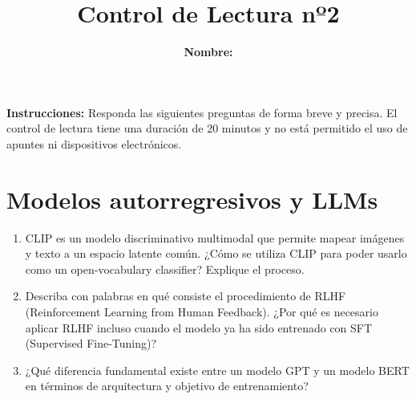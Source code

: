 \documentclass{article}
\title{\bfseries{Control de Lectura nº2}\vspace{0.5cm}}
\author{\textbf{Nombre:} \rule{12cm}{0.4pt}}
\begin{document}
\maketitle

\hspace{-0.5cm}\textbf{Instrucciones:} Responda las siguientes preguntas de forma breve y precisa. El control de lectura tiene una duración de 20 minutos y no está permitido el uso de apuntes ni dispositivos electrónicos.

\section*{Modelos autorregresivos y LLMs}
\begin{enumerate}[{\bf P1.}]
	\item CLIP es un modelo discriminativo multimodal que permite mapear imágenes y texto a un espacio latente común. ¿Cómo se utiliza CLIP para poder usarlo como un open-vocabulary classifier? Explique el proceso.
	\item Describa con palabras en qué consiste el procedimiento de RLHF (Reinforcement Learning from Human Feedback). ¿Por qué es necesario aplicar RLHF incluso cuando el modelo ya ha sido entrenado con SFT (Supervised Fine-Tuning)?
	\item ¿Qué diferencia fundamental existe entre un modelo GPT y un modelo BERT en términos de arquitectura y objetivo de entrenamiento?
\end{enumerate}
\end{document}
